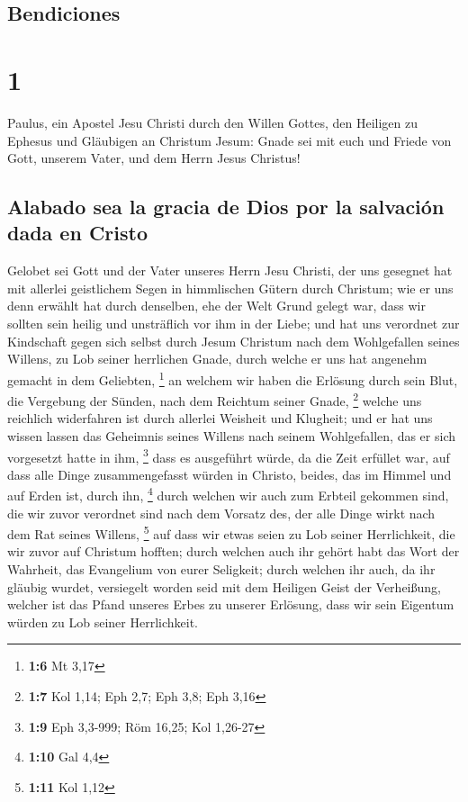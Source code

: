 \hypertarget{bendiciones}{%
\subsection{Bendiciones}\label{bendiciones}}

\hypertarget{section}{%
\section{1}\label{section}}

 Paulus, ein Apostel Jesu Christi durch den Willen Gottes,
den Heiligen zu Ephesus und Gläubigen an Christum Jesum: 
Gnade sei mit euch und Friede von Gott, unserem Vater, und dem Herrn
Jesus Christus!

\hypertarget{alabado-sea-la-gracia-de-dios-por-la-salvaciuxf3n-dada-en-cristo}{%
\subsection{Alabado sea la gracia de Dios por la salvación dada en
Cristo}\label{alabado-sea-la-gracia-de-dios-por-la-salvaciuxf3n-dada-en-cristo}}

 Gelobet sei Gott und der Vater unseres Herrn Jesu
Christi, der uns gesegnet hat mit allerlei geistlichem Segen in
himmlischen Gütern durch Christum;  wie er uns denn
erwählt hat durch denselben, ehe der Welt Grund gelegt war, dass wir
sollten sein heilig und unsträflich vor ihm in der Liebe; 
und hat uns verordnet zur Kindschaft gegen sich selbst durch Jesum
Christum nach dem Wohlgefallen seines Willens,  zu Lob
seiner herrlichen Gnade, durch welche er uns hat angenehm gemacht in dem
Geliebten, \footnote{\textbf{1:6} Mt 3,17}  an welchem wir
haben die Erlösung durch sein Blut, die Vergebung der Sünden, nach dem
Reichtum seiner Gnade, \footnote{\textbf{1:7} Kol 1,14; Eph 2,7; Eph
  3,8; Eph 3,16}  welche uns reichlich widerfahren ist
durch allerlei Weisheit und Klugheit;  und er hat uns
wissen lassen das Geheimnis seines Willens nach seinem Wohlgefallen, das
er sich vorgesetzt hatte in ihm, \footnote{\textbf{1:9} Eph 3,3-999; Röm
  16,25; Kol 1,26-27}  dass es ausgeführt würde, da die
Zeit erfüllet war, auf dass alle Dinge zusammengefasst würden in
Christo, beides, das im Himmel und auf Erden ist, durch ihn, \footnote{\textbf{1:10}
  Gal 4,4}  durch welchen wir auch zum Erbteil gekommen
sind, die wir zuvor verordnet sind nach dem Vorsatz des, der alle Dinge
wirkt nach dem Rat seines Willens, \footnote{\textbf{1:11} Kol 1,12}
 auf dass wir etwas seien zu Lob seiner Herrlichkeit, die
wir zuvor auf Christum hofften;  durch welchen auch ihr
gehört habt das Wort der Wahrheit, das Evangelium von eurer Seligkeit;
durch welchen ihr auch, da ihr gläubig wurdet, versiegelt worden seid
mit dem Heiligen Geist der Verheißung,  welcher ist das
Pfand unseres Erbes zu unserer Erlösung, dass wir sein Eigentum würden
zu Lob seiner Herrlichkeit.

